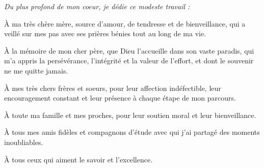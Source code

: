 \documentclass{bts-report}
\begin{document}
\begin{dedicace}
\begin{center}
\vspace*{2cm}
{\itshape
Du plus profond de mon coeur, je d\'edie ce modeste travail :

\`A ma tr\`es ch\`ere m\`ere, source d'amour, de tendresse et de bienveillance, qui a veill\'e sur mes pas avec ses pri\`eres b\'enies tout au long de ma vie.

\`A la m\'emoire de mon cher p\`ere, que Dieu l'accueille dans son vaste paradis, qui m'a appris la pers\'ev\'erance, l'int\'egrit\'e et la valeur de l'effort, et dont le souvenir ne me quitte jamais.

\`A mes tr\`es chers fr\`eres et soeurs, pour leur affection ind\'efectible, leur encouragement constant et leur pr\'esence \`a chaque \'etape de mon parcours.

\`A toute ma famille et mes proches, pour leur soutien moral et leur bienveillance.

\`A tous mes amis fid\`eles et compagnons d'\'etude avec qui j'ai partag\'e des moments inoubliables.

\`A tous ceux qui aiment le savoir et l'excellence.
}
\end{center}
\end{dedicace}
\end{document}
